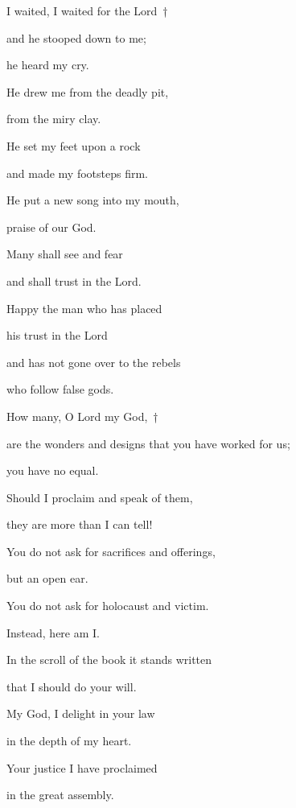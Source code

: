 \noindent I waited, I waited for the Lord~†~\nopagebreak

and he stooped down to me;~\GreStar{}~\nopagebreak

he heard my cry.

\noindent He drew me from the deadly pit,~\GreStar{}~\nopagebreak

from the miry clay.

\noindent He set my feet upon a rock~\GreStar{}~\nopagebreak

and made my footsteps firm.

\noindent He put a new song into my mouth,~\GreStar{}~\nopagebreak

praise of our God.

\noindent Many shall see and fear~\GreStar{}~\nopagebreak

and shall trust in the Lord.

\noindent Happy the man who has placed~\GreStar{}~\nopagebreak

his trust in the Lord

\noindent and has not gone over to the rebels~\GreStar{}~\nopagebreak

who follow false gods.

\noindent How many, O Lord my God,~†~\nopagebreak

are the wonders and designs that you have worked for us;~\GreStar{}~\nopagebreak

you have no equal.

\noindent Should I proclaim and speak of them,~\GreStar{}~\nopagebreak

they are more than I can tell!

\noindent You do not ask for sacrifices and offerings,~\GreStar{}~\nopagebreak

but an open ear.

\noindent You do not ask for holocaust and victim.~\GreStar{}~\nopagebreak

Instead, here am I.

\noindent In the scroll of the book it stands written~\GreStar{}~\nopagebreak

that I should do your will.

\noindent My God, I delight in your law~\GreStar{}~\nopagebreak

in the depth of my heart.

\noindent Your justice I have proclaimed~\GreStar{}~\nopagebreak

in the great assembly.

